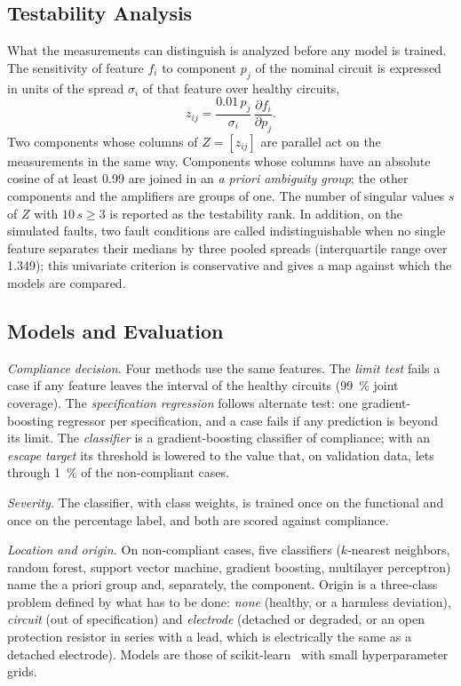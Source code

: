 \subsection{Testability Analysis}
\label{sec:testability}

What the measurements can distinguish is analyzed before any model is trained. The sensitivity of
feature $f_i$ to component $p_j$ of the nominal circuit is expressed in units of the spread
$\sigma_i$ of that feature over healthy circuits,
\begin{equation}
z_{ij} = \frac{0.01\,p_j}{\sigma_i}\,\frac{\partial f_i}{\partial p_j}.
\label{eq:sensitivity}
\end{equation}
Two components whose columns of $Z=[z_{ij}]$ are parallel act on the measurements in the same
way. Components whose columns have an absolute cosine of at least 0.99 are joined in an \emph{a
priori ambiguity group}; the other components and the amplifiers are groups of one. The number
of singular values $s$ of $Z$ with $10\,s\ge 3$ is reported as the testability rank. In addition,
on the simulated faults, two fault conditions are called indistinguishable when no single feature
separates their medians by three pooled spreads (interquartile range over 1.349); this univariate
criterion is conservative and gives a map against which the models are compared.

\subsection{Models and Evaluation}
\label{sec:models}

\emph{Compliance decision.} Four methods use the same features. The \emph{limit test} fails a
case if any feature leaves the interval of the healthy circuits (\SI{99}{\percent} joint
coverage). The \emph{specification regression} follows alternate test: one gradient-boosting
regressor per specification, and a case fails if any prediction is beyond its limit. The
\emph{classifier} is a gradient-boosting classifier of compliance; with an \emph{escape target}
its threshold is lowered to the value that, on validation data, lets through \SI{1}{\percent} of
the non-compliant cases.

\emph{Severity.} The classifier, with class weights, is trained once on the functional and once
on the percentage label, and both are scored against compliance.

\emph{Location and origin.} On non-compliant cases, five classifiers ($k$-nearest neighbors,
random forest, support vector machine, gradient boosting, multilayer perceptron) name the a
priori group and, separately, the component. Origin is a three-class problem defined by what has
to be done: \emph{none} (healthy, or a harmless deviation), \emph{circuit} (out of specification)
and \emph{electrode} (detached or degraded, or an open protection resistor in series with a lead,
which is electrically the same as a detached electrode). Models are those of
scikit-learn~\cite{pedregosa2011} with small hyperparameter grids.

